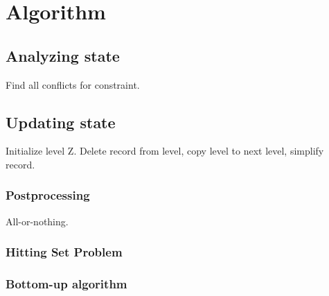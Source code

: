 \section{Algorithm}


\subsection{Analyzing state}

Find all conflicts for constraint.

\subsection{Updating state}

Initialize level Z. Delete record from level, copy level to next level, simplify record.

\subsubsection{Postprocessing}

All-or-nothing.

\subsubsection{Hitting Set Problem}

\subsubsection{Bottom-up algorithm}
